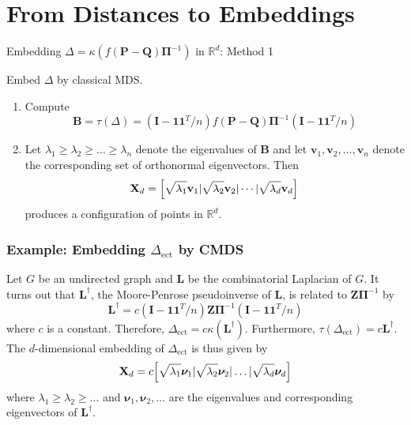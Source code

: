 \documentclass[professionalfonts, hyperref={pdfpagelabels=false,
  colorlinks=true, linkcolor=purple}]{beamer}
\begin{document}
\section{From Distances to Embeddings}

\begin{frame}{Embedding $\Delta = \kappa(f(\mathbf{P} -
    \mathbf{Q})\bm{\Pi}^{-1})$ in $\mathbb{R}^{d}$: Method 1}
  
  Embed $\Delta$ by classical MDS.  
  \vskip 10pt
  \begin{enumerate}
  \item Compute 
    \begin{equation*}
      \mathbf{B} = \tau(\Delta) = (\mathbf{I} -
      \mathbf{1}\mathbf{1}^{T}/n) f(\mathbf{P} - \mathbf{Q})\bm{\Pi}^{-1} (\mathbf{I} -
      \mathbf{1}\mathbf{1}^{T}/n)
    \end{equation*}
  \item Let $\lambda_1 \geq \lambda_2 \geq \dots \geq \lambda_n$
    denote the eigenvalues of $\mathbf{B}$ and let $\bm{v}_1,
    \bm{v}_2, \dots, \bm{v}_n$ denote the corresponding set of
    orthonormal eigenvectors. Then
    \begin{equation*}
      \mathbf{X}_d = \Bigl[ \sqrt{\lambda_1} \mathbf{v}_1 |
      \sqrt{\lambda_2} \mathbf{v}_{2} | \cdots |
      \sqrt{\lambda_d} \mathbf{v}_d \Bigr]
    \end{equation*}
    produces a configuration of points in $\mathbb{R}^{d}$.
  \end{enumerate}
\end{frame}

\begin{frame}
  \frametitle{Example: Embedding $\Delta_{\mathrm{ect}}$ by CMDS}
  Let $G$ be an undirected graph and $\mathbf{L}$ be the combinatorial
  Laplacian of $G$. It turns out that $\mathbf{L}^{\dagger}$, the
  Moore-Penrose pseudoinverse of $\mathbf{L}$, is related to
  $\mathbf{Z}\bm{\Pi}^{-1}$ by
  \begin{equation}
    \label{eq:9}
    \mathbf{L}^{\dagger} = c(\mathbf{I} -
    \mathbf{1}\mathbf{1}^{T}/n)\mathbf{Z}\bm{\Pi}^{-1} (\mathbf{I} -
    \mathbf{1}\mathbf{1}^{T}/n)
 \end{equation}
  where $c$ is a constant. Therefore, $\Delta_{\mathrm{ect}} = c
  \kappa(\mathbf{L}^{\dagger})$. Furthermore,
  $\tau(\Delta_{\mathrm{ect}}) = c\mathbf{L}^{\dagger}$. The
  $d$-dimensional embedding of $\Delta_{\mathrm{ect}}$ is thus given
  by
  \begin{equation}
    \label{eq:10}
    \mathbf{X}_d = c\Bigl[\sqrt{\lambda_1} \bm{\nu}_1 |
    \sqrt{\lambda_2} \bm{\nu}_2 | \dots |  
  \sqrt{\lambda_d} \bm{\nu}_d \Bigr]
  \end{equation}
  where $\lambda_1 \geq \lambda_2 \geq \dots$ and $\bm{\nu}_1,
  \bm{\nu}_2, \dots$ are the eigenvalues and corresponding eigenvectors
  of $\mathbf{L}^{\dagger}$. 
\end{frame}
\end{document}
